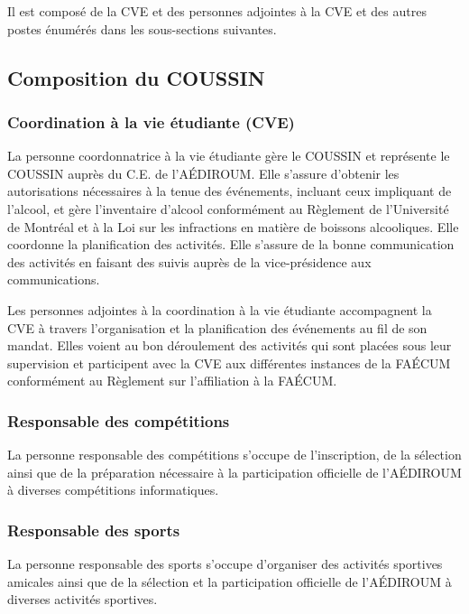 \documentclass{aediroum}
\begin{document}
Il est composé de la CVE et des personnes adjointes à la CVE et des autres postes énumérés dans les sous-sections suivantes.

\subsection{Composition du COUSSIN}

\subsubsection{Coordination à la vie étudiante (CVE)}\label{sec:cve}

La personne coordonnatrice à la vie étudiante gère le COUSSIN et représente le COUSSIN auprès du C.E. de l’AÉDIROUM.
Elle s’assure d’obtenir les autorisations nécessaires à la tenue des événements, incluant ceux impliquant de l’alcool, et gère l’inventaire d’alcool conformément au Règlement de l’Université de Montréal et à la Loi sur les infractions en matière de boissons alcooliques.
Elle coordonne la planification des activités.
Elle s’assure de la bonne communication des activités en faisant des suivis auprès de la vice-présidence aux communications.

Les personnes adjointes à la coordination à la vie étudiante accompagnent la CVE à travers l'organisation et la planification des événements au fil de son mandat.
Elles voient au bon déroulement des activités qui sont placées sous leur supervision et participent avec la CVE aux différentes instances de la FAÉCUM conformément au Règlement sur l’affiliation à la FAÉCUM.

\subsubsection{Responsable des compétitions}\label{sec:responsable-competition}

La personne responsable des compétitions s'occupe de l'inscription, de la sélection ainsi que de la préparation nécessaire à la participation officielle de l'AÉDIROUM à diverses compétitions informatiques.

\subsubsection{Responsable des sports}\label{sec:responsable-sport}

La personne responsable des sports s'occupe d'organiser des activités sportives amicales ainsi que de la sélection et la participation officielle de l'AÉDIROUM à diverses activités sportives.
\end{document}

